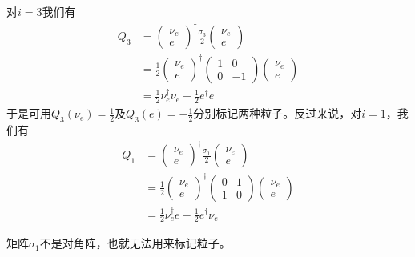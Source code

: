 对$i=3$我们有
\begin{align}
Q_3&=\begin{pmatrix}\nu_e \\ e\end{pmatrix}^\dag\frac{\sigma_3}{2}\begin{pmatrix}\nu_e \\ e\end{pmatrix}\nonumber\\
&=\frac{1}{2}\begin{pmatrix}\nu_e \\ e\end{pmatrix}^\dag\begin{pmatrix}1 & 0 \\ 0 & -1\end{pmatrix}\begin{pmatrix}\nu_e \\ e\end{pmatrix}\nonumber\\
&=\frac{1}{2}\nu_e^\dag\nu_e - \frac{1}{2}e^\dag e
\label{equ7.134}
\end{align}
于是可用$Q_3(\nu_e)=\frac{1}{2}$及$Q_3(e)=-\frac{1}{2}$分别标记两种粒子。反过来说，对$i=1$，我们有
\begin{align}
Q_1&=\begin{pmatrix}\nu_e \\ e\end{pmatrix}^\dag\frac{\sigma_1}{2}\begin{pmatrix}\nu_e \\ e\end{pmatrix}\nonumber\\
&=\frac{1}{2}\begin{pmatrix}\nu_e \\ e\end{pmatrix}^\dag\begin{pmatrix}0  & 1 \\ 1 & 0 \end{pmatrix}\begin{pmatrix}\nu_e \\ e\end{pmatrix}\nonumber\\
&=\frac{1}{2}\nu_e^\dag e - \frac{1}{2}e^\dag \nu_e
\label{equ7.135}
\end{align}

矩阵$\sigma_1$不是对角阵，也就无法用来标记粒子。

